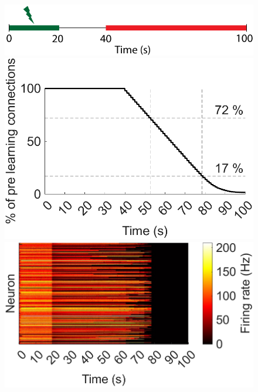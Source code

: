 \documentclass[utf8]{FrontiersinHarvard} %
\begin{document}
\begin{subfigure}
\setcounter{figure}{4}
\setcounter{subfigure}{0}
    \begin{minipage}[b]{0.4\textwidth}
        \includegraphics[width=\linewidth]{AD/stimulation_protocol_AD}
        \caption{}
        \label{figs:results:AD:stimulation_protocol}
    \end{minipage}%
\setcounter{figure}{4}
\setcounter{subfigure}{1}
    \begin{minipage}[b]{0.32\textwidth}
        \includegraphics[width=\linewidth]{AD/connections}
        \caption{}
        \label{figs:results:AD:connections}
    \end{minipage}%
\setcounter{figure}{4}
\setcounter{subfigure}{2}
    \centering
    \begin{minipage}[b]{0.32\textwidth}
        \includegraphics[width=\linewidth]{AD/Hz}

\end{minipage}
\end{subfigure}
\end{document}
